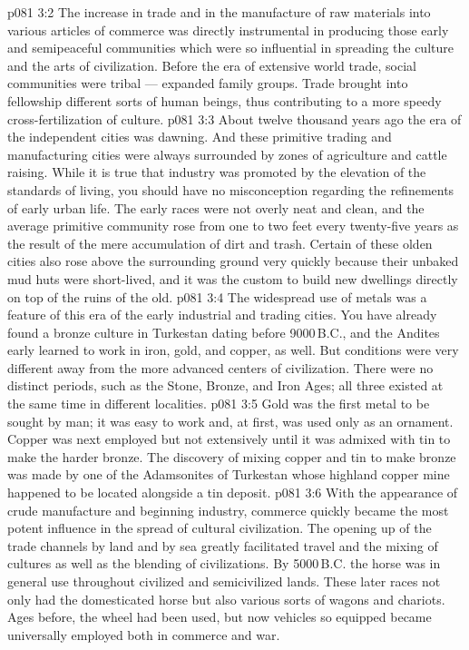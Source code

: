 \vs p081 3:2 The increase in trade and in the manufacture of raw materials into various articles of commerce was directly instrumental in producing those early and semipeaceful communities which were so influential in spreading the culture and the arts of civilization. Before the era of extensive world trade, social communities were tribal --- expanded family groups. Trade brought into fellowship different sorts of human beings, thus contributing to a more speedy cross\hyp{}fertilization of culture.
\vs p081 3:3 About twelve thousand years ago the era of the independent cities was dawning. And these primitive trading and manufacturing cities were always surrounded by zones of agriculture and cattle raising. While it is true that industry was promoted by the elevation of the standards of living, you should have no misconception regarding the refinements of early urban life. The early races were not overly neat and clean, and the average primitive community rose from one to two feet every twenty\hyp{}five years as the result of the mere accumulation of dirt and trash. Certain of these olden cities also rose above the surrounding ground very quickly because their unbaked mud huts were short\hyp{}lived, and it was the custom to build new dwellings directly on top of the ruins of the old.
\vs p081 3:4 \pc The widespread use of metals was a feature of this era of the early industrial and trading cities. You have already found a bronze culture in Turkestan dating before 9000\,B.C., and the Andites early learned to work in iron, gold, and copper, as well. But conditions were very different away from the more advanced centers of civilization. There were no distinct periods, such as the Stone, Bronze, and Iron Ages; all three existed at the same time in different localities.
\vs p081 3:5 Gold was the first metal to be sought by man; it was easy to work and, at first, was used only as an ornament. Copper was next employed but not extensively until it was admixed with tin to make the harder bronze. The discovery of mixing copper and tin to make bronze was made by one of the Adamsonites of Turkestan whose highland copper mine happened to be located alongside a tin deposit.
\vs p081 3:6 \pc With the appearance of crude manufacture and beginning industry, commerce quickly became the most potent influence in the spread of cultural civilization. The opening up of the trade channels by land and by sea greatly facilitated travel and the mixing of cultures as well as the blending of civilizations. By 5000\,B.C. the horse was in general use throughout civilized and semicivilized lands. These later races not only had the domesticated horse but also various sorts of wagons and chariots. Ages before, the wheel had been used, but now vehicles so equipped became universally employed both in commerce and war.
